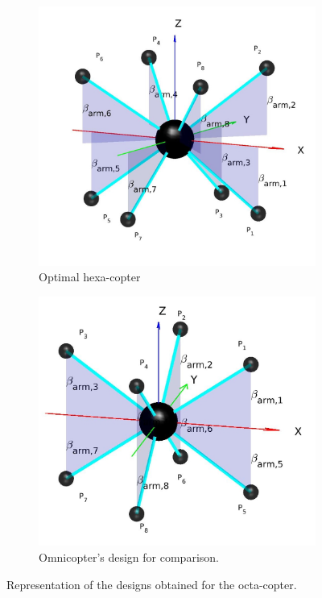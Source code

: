 \begin{figure}[!ht]
  \begin{subfigure}[b]{0.49\textwidth}
    \includegraphics[width=\linewidth]{images/Octacopter.jpg}
    \caption{Optimal hexa-copter} \label{fig:Octacopter_resulta}
  \end{subfigure}
  \hspace*{\fill} %
  \begin{subfigure}[b]{0.49\textwidth}
    \includegraphics[width=\linewidth]{images/omnicopter.jpg}
    \caption{Omnicopter's design for comparison.} \label{fig:Octacopter_resultb}
  \end{subfigure}
  \caption{Representation of the designs obtained for the octa-copter.}
  \label{fig:Octacopter_result}
\end{figure}

